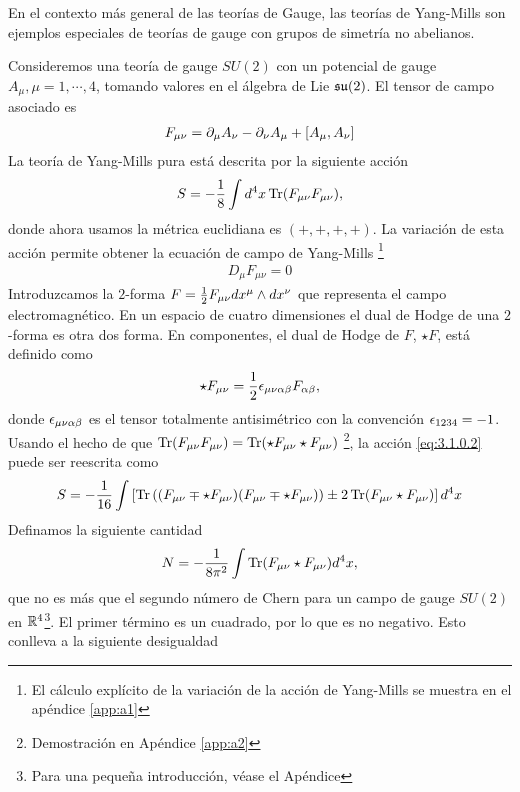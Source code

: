 En el contexto más general de las teorías de Gauge, las teorías de Yang-Mills son ejemplos especiales de teorías de gauge con grupos de simetría no abelianos.

Consideremos una teoría de gauge $SU(2)$ con un potencial de gauge $A_\mu, \mu=1,\cdots,4$, tomando valores en el álgebra de Lie $\mathfrak{su}(2)$. El tensor de campo asociado es
\begin{align}
	F_{\mu\nu} = \partial_\mu A_\nu-\partial_\nu A_\mu+[A_\mu,A_\nu] \label{eq:3.1.0.1}
\end{align}
La teoría de Yang-Mills pura está descrita por la siguiente acción
\begin{align}
	S=-\frac{1}{8}\int d^4x \operatorname{Tr}(F_{\mu\nu}F_{\mu\nu}), \label{eq:3.1.0.2}
\end{align}
donde ahora usamos la métrica euclidiana es $(+,+,+,+)$. La variación de esta acción permite obtener la ecuación de campo de Yang-Mills \footnote{El cálculo explícito de la variación de la acción de Yang-Mills se muestra en el apéndice \ref{app:a1}}
\begin{align}
	D_\mu F_{\mu\nu} =0 \label{eq:3.1.0.3}
\end{align}
Introduzcamos la $2$-forma $F=\frac{1}{2}F_{\mu\nu}dx^\mu\wedge dx^\nu$ que representa el campo electromagnético. En un espacio de cuatro dimensiones el dual de Hodge de una $2$-forma es otra dos forma. En componentes, el dual de Hodge de $F$, $\star F$, está definido como
\begin{align}
	\star F_{\mu\nu} = \frac{1}{2}\epsilon_{\mu\nu\alpha\beta}F_{\alpha\beta},  \label{eq:3.1.0.4}
\end{align}
donde $\epsilon_{\mu\nu\alpha\beta}$ es el tensor totalmente antisimétrico con la convención $\epsilon_{1234}=-1$. Usando el hecho de que $\operatorname{Tr}(F_{\mu\nu}F_{\mu\nu})=\operatorname{Tr}(\star F_{\mu\nu}\star F_{\mu\nu})$ \footnote{Demostración en Apéndice \ref{app:a2} }, la acción \eqref{eq:3.1.0.2} puede ser reescrita como
\begin{align}
	S = -\frac{1}{16}\int\left[\operatorname{Tr}\left((F_{\mu\nu}\mp\star F_{\mu\nu})(F_{\mu\nu}\mp\star F_{\mu\nu})\right)\pm 2\operatorname{Tr}(F_{\mu\nu}\star F_{\mu\nu})\right]d^4x \label{eq:3.1.0.5}
\end{align}
Definamos la siguiente cantidad
\begin{align}
	N = -\frac{1}{8\pi^2}\int\operatorname{Tr}(F_{\mu\nu}\star F_{\mu\nu})d^4x, \label{eq:3.1.0.6}
\end{align}
que no es más que el segundo número de Chern para un campo de gauge $SU(2)$ en $\mathbb{R}^4$\footnote{Para una pequeña introducción, véase el Apéndice}. El primer término es un cuadrado, por lo que es no negativo. Esto conlleva a la siguiente desigualdad
